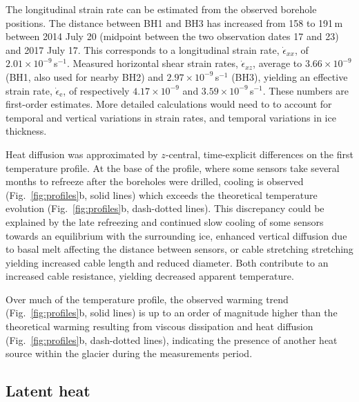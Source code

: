 \documentclass[utf8]{article}
\begin{document}
    The longitudinal strain rate can be estimated from the observed borehole
    positions. The distance between BH1 and BH3
    has increased from 158 to 191\,m between 2014 July 20 (midpoint
    between the two observation dates 17 and 23) and 2017 July 17. This
    corresponds to a longitudinal strain rate, $\dot\epsilon_{xx}$, of
    $2.01\times10^{-9}$\,s$^{-1}$. Measured horizontal shear strain rates,
    $\dot\epsilon_{xz}$, average to $3.66\times10^{-9}$ (BH1, also used for
    nearby BH2) and $2.97\times10^{-9}$\,s$^{-1}$ (BH3), yielding an effective
    strain rate, $\dot\epsilon_\mathrm{e}$, of respectively $4.17\times10^{-9}$
    and $3.59\times10^{-9}$\,s$^{-1}$. These numbers are first-order estimates.
    More detailed calculations would need to to account for temporal and
    vertical variations in strain rates, and temporal variations in ice
    thickness.

    Heat diffusion was approximated by $z$-central, time-explicit differences
    on the first temperature profile. At the base of the profile, where
    some sensors take several months to refreeze after the boreholes were
    drilled, cooling is observed (Fig.~\ref{fig:profiles}b, solid lines) which
    exceeds the theoretical temperature evolution (Fig.~\ref{fig:profiles}b,
    dash-dotted lines). This discrepancy could be explained by the late
    refreezing and continued slow cooling of some sensors towards an equilibrium
    with the surrounding ice, enhanced vertical diffusion due to basal melt
    affecting the distance between sensors, or cable stretching stretching
    yielding increased cable length and reduced diameter. Both contribute to an
    increased cable resistance, yielding decreased apparent temperature.

    Over much of the temperature profile, the observed warming trend
    (Fig.~\ref{fig:profiles}b, solid lines) is up to an order of magnitude
    higher than the theoretical warming resulting from viscous
    dissipation and heat diffusion (Fig.~\ref{fig:profiles}b, dash-dotted
    lines), indicating the presence of another heat source within the glacier
    during the measurements period.


\subsection{Latent heat}
\end{document}
